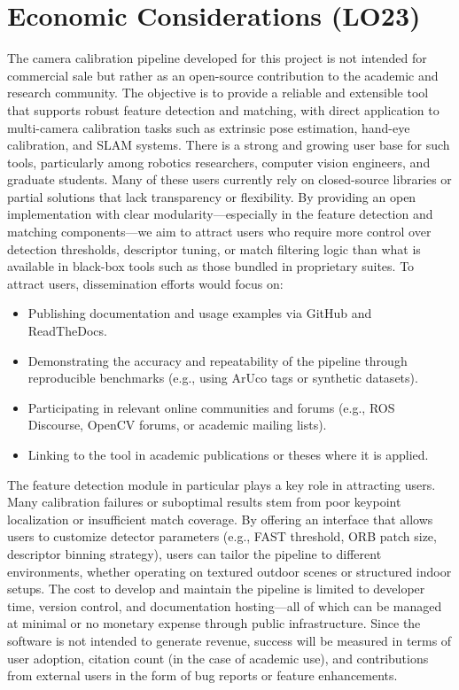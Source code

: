 \documentclass{article}
\begin{document}
\section{Economic Considerations (LO23)}
The camera calibration pipeline developed for this project is not intended for commercial sale but rather as an open-source contribution to the academic and research community. The objective is to provide a reliable and extensible tool that supports robust feature detection and matching, with direct application to multi-camera calibration tasks such as extrinsic pose estimation, hand-eye calibration, and SLAM systems.
\newline
\newline
There is a strong and growing user base for such tools, particularly among robotics researchers, computer vision engineers, and graduate students. Many of these users currently rely on closed-source libraries or partial solutions that lack transparency or flexibility. By providing an open implementation with clear modularity---especially in the feature detection and matching components---we aim to attract users who require more control over detection thresholds, descriptor tuning, or match filtering logic than what is available in black-box tools such as those bundled in proprietary suites.
\newline
\newline
To attract users, dissemination efforts would focus on:
\begin{itemize}
    \item Publishing documentation and usage examples via GitHub and ReadTheDocs.
    \item Demonstrating the accuracy and repeatability of the pipeline through reproducible benchmarks (e.g., using ArUco tags or synthetic datasets).
    \item Participating in relevant online communities and forums (e.g., ROS Discourse, OpenCV forums, or academic mailing lists).
    \item Linking to the tool in academic publications or theses where it is applied.
\end{itemize}
The feature detection module in particular plays a key role in attracting users. Many calibration failures or suboptimal results stem from poor keypoint localization or insufficient match coverage. By offering an interface that allows users to customize detector parameters (e.g., FAST threshold, ORB patch size, descriptor binning strategy), users can tailor the pipeline to different environments, whether operating on textured outdoor scenes or structured indoor setups.
\newline
\newline
The cost to develop and maintain the pipeline is limited to developer time, version control, and documentation hosting---all of which can be managed at minimal or no monetary expense through public infrastructure. Since the software is not intended to generate revenue, success will be measured in terms of user adoption, citation count (in the case of academic use), and contributions from external users in the form of bug reports or feature enhancements.
\end{document}
